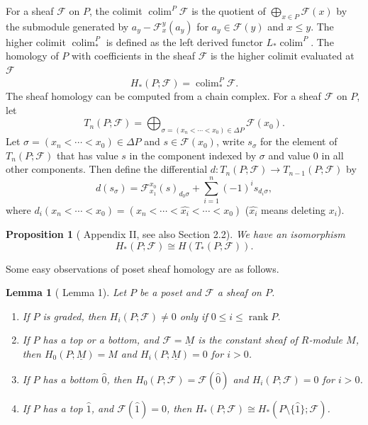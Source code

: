 \documentclass{amsart}
\numberwithin{equation}{section}
\newtheorem{prop}[thm]{Proposition}
\theoremstyle{plain}
\newtheorem{lem}[thm]{Lemma}
\theoremstyle{remark}
\theoremstyle{definition}
\numberwithin{equation}{section}
\newcommand{\FF}{\mathscr{F}}
\DeclareMathOperator{\rank}{rank}
\DeclareMathOperator{\colim}{colim}
\begin{document}
For a sheaf $\FF$ on $P$, the colimit $\colim^P\FF$ is the quotient of $\bigoplus_{x\in P}\FF(x)$ by the submodule generated by $a_y-\FF^y_x(a_y)$ for $a_y\in \FF(y)$ and $x\leq y$. The higher colimit $\colim_*^P$ is defined as the left derived functor $L_*\colim^P$. The homology of $P$ with coefficients in the sheaf $\FF$ is the higher colimit evaluated at $\FF$
\[
H_*(P;\FF)=\colim_*^P\FF.
\]
The sheaf homology can be computed from a chain complex. For a sheaf $\FF$ on $P$, let
\[
T_n(P;\FF)=\bigoplus_{\sigma=(x_n<\cdots< x_0)\in\Delta P}\FF(x_0).
\]
Let $\sigma=(x_n< \cdots< x_0)\in \Delta P$ and $s\in \FF(x_0)$, write $s_{\sigma}$ for the element of $T_n(P;\FF)$ that has value $s$ in the component indexed by $\sigma$ and value $0$ in all other components. Then define the differential $d: T_n(P;\FF)\to T_{n-1}(P;\FF)$ by
\[
d(s_{\sigma})=\FF^{x_0}_{x_1}(s)_{d_0\sigma}+\sum_{i=1}^n(-1)^is_{d_i\sigma},
\]
where $d_i(x_n<\cdots< x_0)=(x_n<\cdots< \widehat{x_i}<\cdots< x_0)$ ($\widehat{x_i}$ means deleting $x_i$). 
\begin{prop}[\cite{Gabriel1967} Appendix II, see also \cite{Everitt2022} Section 2.2]\label{chaincomplex}
    We have an isomorphism
\[
H_*(P;\FF)\cong H(T_*(P;\FF)).
\]
\end{prop}

Some easy observations of poset sheaf homology are as follows.
\begin{lem}[\cite{Everitt2022} Lemma 1]\label{basiclemma}
    Let $P$ be a poset and $\FF$ a sheaf on $P$.
    \begin{enumerate}
        \item If $P$ is graded, then $H_i(P;\FF)\neq 0$ only if $0\leq i\leq \rank P$.
        \item If $P$ has a top or a bottom, and $\FF=\underline{M}$ is the constant sheaf of $R$-module $M$, then $H_0(P;\underline{M})=M$ and $H_i(P;\underline{M})=0$ for $i>0$.
        \item If $P$ has a bottom $\hat{0}$, then $H_0(P;\FF)=\FF(\hat{0})$ and $H_i(P;\FF)=0$ for $i>0$.
        \item If $P$ has a top $\hat{1}$, and $\FF(\hat{1})=0$, then $H_*(P;\FF)\cong H_*(P\setminus\{\hat{1}\};\FF)$.
    \end{enumerate}
\end{lem}
\end{document}
